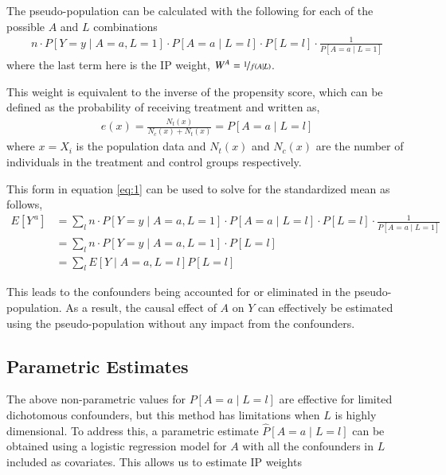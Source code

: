 The pseudo-population can be calculated with the following for each of the possible $A$ and $L$ combinations 
\begin{align} \label{eq:1}
n\cdot P[Y=y \mid A = a, L= 1] \cdot P[A=a \mid L=l]  \cdot P[L=l] \cdot \frac{1}{P[A = a \mid L = 1]} \end{align}  
where the last term here is the IP weight, $W^{A} = \nicefrac{1}{f(A\mid L)}$.  

This weight is equivalent to the inverse of the propensity score, which can be defined as the probability of receiving treatment and written as,\cite{imbens2015causal}
\begin{align} 
e(x) = \frac{N_t(x)}{N_c(x) + N_t(x)} = P[A=a \mid L = l] 
\end{align} 
where $x = X_i$ is the population data and $N_t(x)$ and $N_c (x)$ are the number of individuals in the treatment and control groups respectively.  

This form in equation \ref{eq:1} can be used to solve for the standardized mean as follows, 
\begin{align} 
E[Y^{\,a}] &= \sum_l n \cdot P[Y=y \mid A = a, L= 1] \cdot P[A=a \mid L=l]  \cdot P[L=l] \cdot \frac{1}{P[A = a \mid L = 1]} \\ 
&=  \sum_l n \cdot P[Y=y \mid A = a, L= 1] \cdot P[L=l]\\ 
&= \sum_l E[Y \mid A=a, L= l] P[L=l] 
\end{align} 

This leads to the confounders being accounted for or eliminated in the pseudo-population.  As a result, the causal effect of $A$ on $Y$ can effectively be estimated using the pseudo-population without any impact from the confounders.  

\subsection{Parametric Estimates} 
The above non-parametric values for $P[A=a\mid L=l]$ are effective for limited dichotomous confounders, but this method has limitations when $L$ is highly dimensional.  To address this, a parametric estimate $\widehat{P}[A=a\mid L=l]$ can be obtained using a logistic regression model for $A$ with all the confounders in $L$ included as covariates.  This allows us to estimate IP weights 

